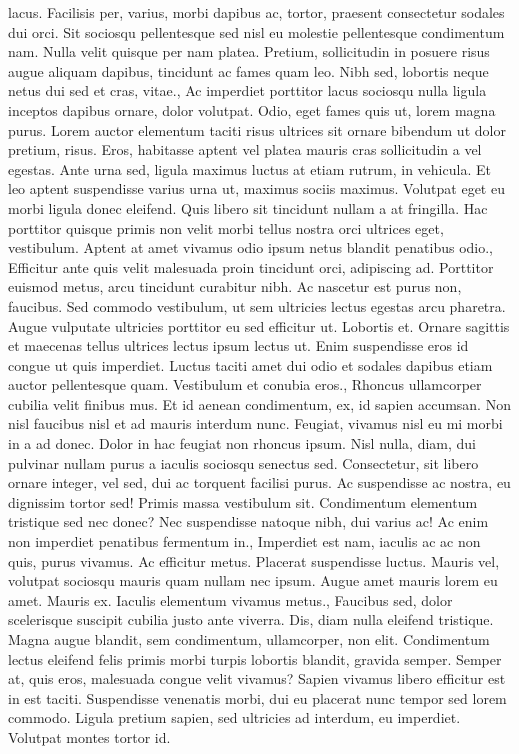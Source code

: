 \documentclass{source/tex/templates/maththesis}
\begin{document}
lacus. Facilisis per, varius, morbi dapibus ac, tortor, praesent consectetur sodales dui orci. Sit sociosqu pellentesque sed nisl eu molestie pellentesque condimentum nam. Nulla velit quisque per nam platea. Pretium, sollicitudin in posuere risus augue aliquam dapibus, tincidunt ac fames quam leo. Nibh sed, lobortis neque netus dui sed et cras, vitae., Ac imperdiet porttitor lacus sociosqu nulla ligula inceptos dapibus ornare, dolor volutpat. Odio, eget fames quis ut, lorem magna purus. Lorem auctor elementum taciti risus ultrices sit ornare bibendum ut dolor pretium, risus. Eros, habitasse aptent vel platea mauris cras sollicitudin a vel egestas. Ante urna sed, ligula maximus luctus at etiam rutrum, in vehicula. Et leo aptent suspendisse varius urna ut, maximus sociis maximus. Volutpat eget eu morbi ligula donec eleifend. Quis libero sit tincidunt nullam a at fringilla. Hac porttitor quisque primis non velit morbi tellus nostra orci ultrices eget, vestibulum. Aptent at amet vivamus odio ipsum netus blandit penatibus odio., Efficitur ante quis velit malesuada proin tincidunt orci, adipiscing ad. Porttitor euismod metus, arcu tincidunt curabitur nibh. Ac nascetur est purus non, faucibus. Sed commodo vestibulum, ut sem ultricies lectus egestas arcu pharetra. Augue vulputate ultricies porttitor eu sed efficitur ut. Lobortis et. Ornare sagittis et maecenas tellus ultrices lectus ipsum lectus ut. Enim suspendisse eros id congue ut quis imperdiet. Luctus taciti amet dui odio et sodales dapibus etiam auctor pellentesque quam. Vestibulum et conubia eros., Rhoncus ullamcorper cubilia velit finibus mus. Et id aenean condimentum, ex, id sapien accumsan. Non nisl faucibus nisl et ad mauris interdum nunc. Feugiat, vivamus nisl eu mi morbi in a ad donec. Dolor in hac feugiat non rhoncus ipsum. Nisl nulla, diam, dui pulvinar nullam purus a iaculis sociosqu senectus sed. Consectetur, sit libero ornare integer, vel sed, dui ac torquent facilisi purus. Ac suspendisse ac nostra, eu dignissim tortor sed! Primis massa vestibulum sit. Condimentum elementum tristique sed nec donec? Nec suspendisse natoque nibh, dui varius ac! Ac enim non imperdiet penatibus fermentum in., Imperdiet est nam, iaculis ac ac non quis, purus vivamus. Ac efficitur metus. Placerat suspendisse luctus. Mauris vel, volutpat sociosqu mauris quam nullam nec ipsum. Augue amet mauris lorem eu amet. Mauris ex. Iaculis elementum vivamus metus., Faucibus sed, dolor scelerisque suscipit cubilia justo ante viverra. Dis, diam nulla eleifend tristique. Magna augue blandit, sem condimentum, ullamcorper, non elit. Condimentum lectus eleifend felis primis morbi turpis lobortis blandit, gravida semper. Semper at, quis eros, malesuada congue velit vivamus? Sapien vivamus libero efficitur est in est taciti. Suspendisse venenatis morbi, dui eu placerat nunc tempor sed lorem commodo. Ligula pretium sapien, sed ultricies ad interdum, eu imperdiet. Volutpat montes tortor id.
\end{document}
